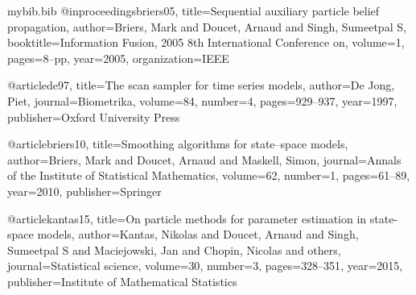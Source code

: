 \begin{filecontents*}{mybib.bib}
@inproceedings{briers05,
  title={Sequential auxiliary particle belief propagation},
  author={Briers, Mark and Doucet, Arnaud and Singh, Sumeetpal S},
  booktitle={Information Fusion, 2005 8th International Conference on},
  volume={1},
  pages={8--pp},
  year={2005},
  organization={IEEE}
}

@article{de97,
  title={The scan sampler for time series models},
  author={De Jong, Piet},
  journal={Biometrika},
  volume={84},
  number={4},
  pages={929--937},
  year={1997},
  publisher={Oxford University Press}
}

@article{briers10,
  title={Smoothing algorithms for state--space models},
  author={Briers, Mark and Doucet, Arnaud and Maskell, Simon},
  journal={Annals of the Institute of Statistical Mathematics},
  volume={62},
  number={1},
  pages={61--89},
  year={2010},
  publisher={Springer}
}

@article{kantas15,
  title={On particle methods for parameter estimation in state-space models},
  author={Kantas, Nikolas and Doucet, Arnaud and Singh, Sumeetpal S and Maciejowski, Jan and Chopin, Nicolas and others},
  journal={Statistical science},
  volume={30},
  number={3},
  pages={328--351},
  year={2015},
  publisher={Institute of Mathematical Statistics}
}
\end{filecontents*}

\documentclass{article}

\usepackage[round]{natbib}
\usepackage{amsmath} \usepackage{bm} \usepackage{amsfonts}
\usepackage{algorithm} \usepackage{algpseudocode} \usepackage{hyperref}

\newcommand\StateX{\Statex\hspace{\algorithmicindent}}
\newcommand\StateXX{\Statex\hspace{\algorithmicindent}\hspace{\algorithmicindent}}
\newcommand\StateXXX{\Statex\hspace{\algorithmicindent}\hspace{\algorithmicindent}\hspace{\algorithmicindent}}

\algnewcommand{\UntilElse}[2]{\Until{#1\ \algorithmicelse\ #2}}

 

\algnewcommand{}
\algnewcommand\INPUT{\item[\algorithmicinput]}

\newcommand{\citeAlgLine}[2]{line~\ref{#1} of algorithm~\ref{#2}}
\newcommand{\citeAlgLineTwo}[3]{line~\ref{#1} and~\ref{#2} of algorithm~\ref{#3}}
\newcommand{\citeAlgLineTo}[3]{lines~\ref{#1}-\ref{#2} of algorithm~\ref{#3}}


